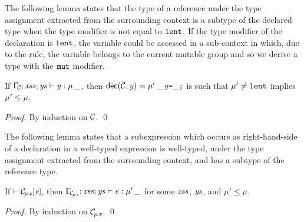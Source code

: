 {The following lemma states that the type of a reference under the type assignment extracted from the surrounding context is a subtype of the declared type  {when the type modifier is not equal to $\texttt{lent}$. If the type modifier of the declaration is $\texttt{lent}$, the variable
could be accessed in a sub-context in which, due to the  rule, the variable belongs to the current mutable
group and so we derive a type with the $\texttt{mut}$ modifier.}
\begin{lemma}\label{lemma:dec}
If $\Gamma_{\!{\cal{C}}};\mathit{xss};\mathit{ys}\vdash {\mathit{y}}:\mu\,\_$, then $\textsf{dec}({\cal{C}},\mathit{y})=\mu'\,\_\,\mathit{y}\texttt{=}\_\texttt{;}$  {is such that $\mu'\neq\texttt{lent}$ implies $\mu'\leq\mu$}.
\end{lemma}
\begin{proof}
By induction on ${\cal{C}}$. \qed
\end{proof}

 The following lemma states that a subexpression which occurs as right-hand-side of a declaration in a well-typed expression is well-typed, under the type assignment extracted from the surrounding context, and has a subtype of the reference type.
\begin{lemma}\label{lemma:decctx}
If $\vdash {\cal C}\!_{\mu\hspace{.015cm}\mathit{x}}[\mathit{e}]$, then $\Gamma_{\!{\cal C}\!_{\mu\hspace{.015cm}\mathit{x}}};\mathit{xss};\mathit{ys}\vdash {\mathit{e}}:\mu'\,\_$ for some
$\mathit{xss}$, $\mathit{ys}$, and $\mu'\leq\mu$.
\end{lemma}
\begin{proof}
By induction on ${\cal C}\!_{\mu\hspace{.015cm}\mathit{x}}$. \qed
\end{proof}

}
